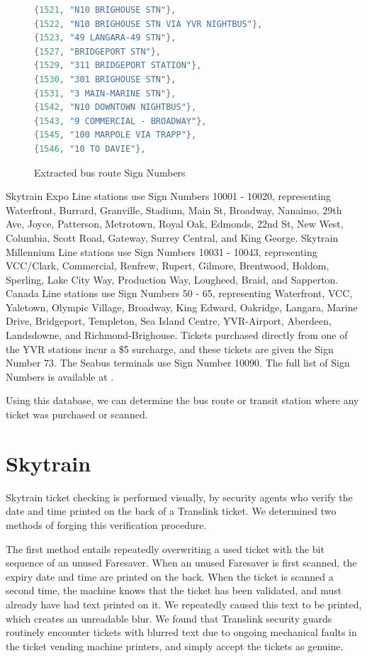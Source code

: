 \documentclass[fontsize=12pt]{scrartcl}
\begin{document}
\begin{figure}[ht!]
\centering
\begin{lstlisting}[language=C]
{1521, "N10 BRIGHOUSE STN"},
{1522, "N10 BRIGHOUSE STN VIA YVR NIGHTBUS"},
{1523, "49 LANGARA-49 STN"},
{1527, "BRIDGEPORT STN"},
{1529, "311 BRIDGEPORT STATION"},
{1530, "301 BRIGHOUSE STN"},
{1531, "3 MAIN-MARINE STN"},
{1542, "N10 DOWNTOWN NIGHTBUS"},
{1543, "9 COMMERCIAL - BROADWAY"},
{1545, "100 MARPOLE VIA TRAPP"},
{1546, "10 TO DAVIE"},
\end{lstlisting}
\caption{Extracted bus route Sign Numbers}
\end{figure}

Skytrain Expo Line stations use Sign Numbers 10001 - 10020, representing Waterfront, Burrard, Granville, Stadium, Main St, Broadway, Nanaimo, 29th Ave, Joyce, Patterson, Metrotown, Royal Oak, Edmonds, 22nd St, New West, Columbia, Scott Road, Gateway, Surrey Central, and King George. Skytrain Millennium Line stations use Sign Numbers 10031 - 10043, representing VCC/Clark, Commercial, Renfrew, Rupert, Gilmore, Brentwood, Holdom, Sperling, Lake City Way, Production Way, Lougheed, Braid, and Sapperton. Canada Line stations use Sign Numbers 50 - 65, representing Waterfront, VCC, Yaletown, Olympic Village, Broadway, King Edward, Oakridge, Langara, Marine Drive, Bridgeport, Templeton, Sea Island Centre, YVR-Airport, Aberdeen, Landsdowne, and Richmond-Brighouse. Tickets purchased directly from one of the YVR stations incur a \$5 surcharge, and these tickets are given the Sign Number 73. The Seabus terminals use Sign Number 10090. The full list of Sign Numbers is available at \cite{bussesh}.

Using this database, we can determine the bus route or transit station where any ticket was purchased or scanned. 

\section{Skytrain}
Skytrain ticket checking is performed visually, by security agents who verify the date and time printed on the back of a Translink ticket. We determined two methods of forging this verification procedure.

The first method entails repeatedly overwriting a used ticket with the bit sequence of an unused Faresaver. When an unused Faresaver is first scanned, the expiry date and time are printed on the back. When the ticket is scanned a second time, the machine knows that the ticket has been validated, and must already have had text printed on it. We repeatedly caused this text to be printed, which creates an unreadable blur. We found that Translink security guards routinely encounter tickets with blurred text due to ongoing mechanical faults in the ticket vending machine printers, and simply accept the tickets as genuine.
\end{document}
